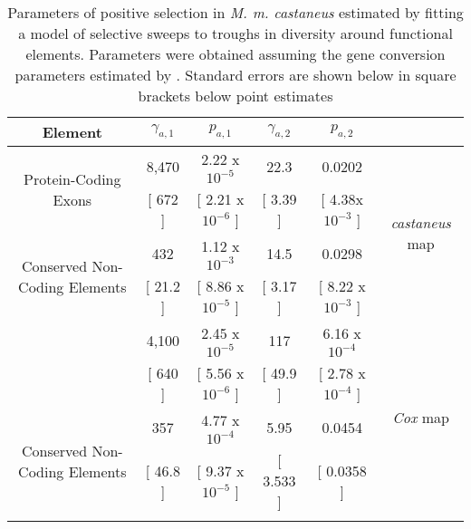 

\begin{table}[h]
\caption{Parameters of positive selection in \textit{M. m. castaneus} estimated by fitting a model of selective sweeps to troughs in diversity around functional elements. Parameters were obtained assuming the gene conversion parameters estimated by \cite{RN263}. Standard errors are shown below in square brackets below point estimates}
\centering
	\label{EstimatesCastaneus}
        \begin{tabular}{cccccc}

        \hline
  Element  &  $\gamma_{a,1}$ & $p_{a,1}$ &$\gamma_{a,2}$ & $p_{a,2}$ &  \\ [0.5ex] \hline

\multirow{2}{*}{Protein-Coding Exons} &  8,470 & 2.22 x $10^{-5}$ & 22.3 & 0.0202 & \multirow{4}{*}{\textit{castaneus} map}\\
   &  [ 672 ] & [ 2.21 x $10^{-6}$ ]& [ 3.39 ] & [ 4.38x $10^{-3}$ ] & \\ 
\multirow{2}{*}{Conserved Non-Coding Elements}  & 432 & 1.12 x $10^{-3}$ & 14.5 & 0.0298 & \\
  &   [ 21.2 ] & [ 8.86 x $10^{-5}$ ]& [ 3.17 ] & [ 8.22 x $10^{-3}$ ] &\\ \hdashline
\multirow{2}{*}{Protein-Coding Exons} &  4,100 & 2.45 x $10^{-5}$ & 117 & 6.16 x $10^{-4}$  & \multirow{4}{*}{\textit{Cox} map}\\
   &  [ 640 ] & [ 5.56 x $10^{-6}$ ]& [ 49.9 ] & [ 2.78 x $10^{-4}$ ] & \\ 
   
\multirow{2}{*}{Conserved Non-Coding Elements}  & 357  &  4.77 x $10^{-4}$ & 5.95 & 0.0454 & \\
  &   [ 46.8 ] & [ 9.37 x $10^{-5}$ ]& [ 3.533 ] & [  0.0358 ] &\\ \hdashline
        \end{tabular}
    \label{tab:Table2}
    
\end{table}

\linespread{1}
